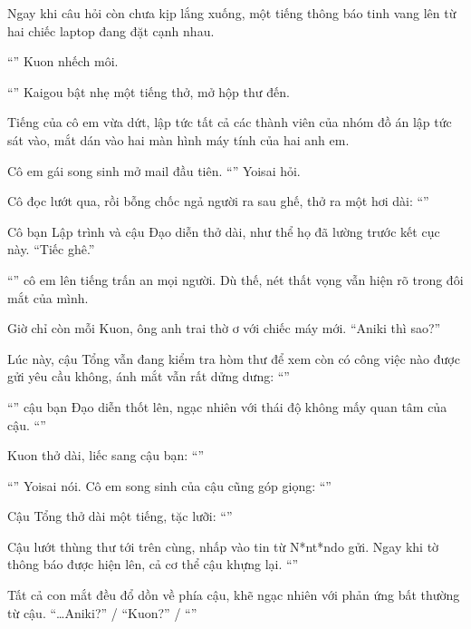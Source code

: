\documentclass[../main.tex]{subfiles}
\begin{document}
Ngay khi câu hỏi còn chưa kịp lắng xuống, một tiếng thông báo tinh vang lên từ hai chiếc laptop đang đặt cạnh nhau.

``'' Kuon nhếch môi.

``'' Kaigou bật nhẹ một tiếng thở, mở hộp thư đến.

Tiếng của cô em vừa dứt, lập tức tất cả các thành viên của nhóm đồ án lập tức sát vào, mắt dán vào hai màn hình máy tính của hai anh em.

Cô em gái song sinh mở mail đầu tiên. ``'' Yoisai hỏi.

Cô đọc lướt qua, rồi bỗng chốc ngả người ra sau ghế, thở ra một hơi dài: ``''

Cô bạn Lập trình và cậu Đạo diễn thở dài, như thể họ đã lường trước kết cục này. ``Tiếc ghê.''

``'' cô em lên tiếng trấn an mọi người. Dù thế, nét thất vọng vẫn hiện rõ trong đôi mắt của mình.

Giờ chỉ còn mỗi Kuon, ông anh trai thờ ơ với chiếc máy mới. ``Aniki thì sao?''

Lúc này, cậu Tổng vẫn đang kiểm tra hòm thư để xem còn có công việc nào được gửi yêu cầu không, ánh mắt vẫn rất dửng dưng: ``''

``'' cậu bạn Đạo diễn thốt lên, ngạc nhiên với thái độ không mấy quan tâm của cậu. ``''

Kuon thở dài, liếc sang cậu bạn: ``''

``'' Yoisai nói. Cô em song sinh của cậu cũng góp giọng: ``''

Cậu Tổng thở dài một tiếng, tặc lưỡi: ``''

Cậu lướt thùng thư tới trên cùng, nhấp vào tin từ N*nt*ndo gửi. Ngay khi tờ thông báo được hiện lên, cả cơ thể cậu khựng lại. ``''

Tất cả con mắt đều đổ dồn về phía cậu, khẽ ngạc nhiên với phản ứng bất thường từ cậu. ``\dots Aniki?'' / ``Kuon?'' / ``''
\end{document}
